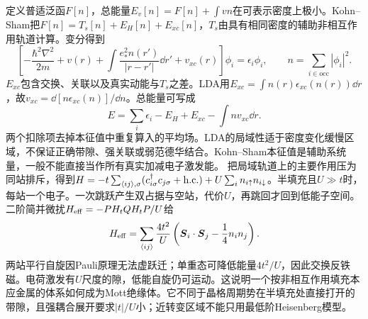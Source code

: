 定义普适泛函$F[n]$，总能量$E_v[n]=F[n]+\int vn$在可表示密度上极小。Kohn--Sham把$F[n]=T_s[n]+E_H[n]+E_{xc}[n]$，$T_s$由具有相同密度的辅助非相互作用轨道计算。变分得到
\begin{equation}
\left[-\frac{\hbar^2\nabla^2}{2m}+v(r)+\int\frac{e_*^2 n(r')}{|r-r'|}\dd r'+v_{xc}(r)\right]\phi_i=\epsilon_i\phi_i,\qquad n=\sum_{i\in\mathrm{occ}}|\phi_i|^2.
\end{equation}
$E_{xc}$包含交换、关联以及真实动能与$T_s$之差。LDA用$E_{xc}=\int n(r)\epsilon_{xc}(n(r))\dd r$，故$v_{xc}=\dd[n\epsilon_{xc}(n)]/\dd n$。总能量可写成
\begin{equation}
E=\sum_i\epsilon_i-E_H+E_{xc}-\int nv_{xc}\dd r.
\end{equation}
两个扣除项去掉本征值中重复算入的平均场。LDA的局域性适于密度变化缓慢区域，不保证正确带隙、强关联或弱范德华结合。Kohn--Sham本征值是辅助系统量，一般不能直接当作所有真实加减电子激发能。
把局域轨道上的主要作用压为同站排斥，得到$H=-t\sum_{\langle ij\rangle,\sigma}(c_{i\sigma}^\dagger c_{j\sigma}+\mathrm{h.c.})+U\sum_i n_{i\uparrow}n_{i\downarrow}$。半填充且$U\gg t$时，每站一个电子。一次跳跃产生双占据与空站，代价$U$，再跳回才回到低能子空间。二阶简并微扰$H_{\rm eff}=-PH_tQH_tP/U$给
\begin{equation}
H_{\rm eff}=\sum_{\langle ij\rangle}\frac{4t^2}{U}\left(\boldsymbol{S}_i\cdot\boldsymbol{S}_j-\frac14n_in_j\right).
\end{equation}
两站平行自旋因Pauli原理无法虚跃迁；单重态可降低能量$4t^2/U$，因此交换反铁磁。电荷激发有$U$尺度的隙，低能自旋仍可运动。这说明一个按非相互作用填充本应金属的体系如何成为Mott绝缘体。它不同于晶格周期势在半填充处直接打开的带隙，且强耦合展开要求$|t|/U$小；近转变区域不能只用最低阶Heisenberg模型。
